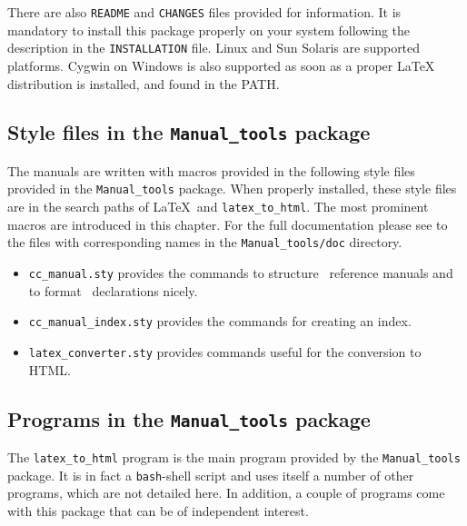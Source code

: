 There are also \texttt{README} and \texttt{CHANGES} files provided for
information. It is mandatory to install this package properly on your
system following the description in the \texttt{INSTALLATION} file. Linux
and Sun Solaris are supported platforms. Cygwin on Windows is also
supported as soon as a proper LaTeX distribution is installed, and
found in the PATH.

\subsection{Style files in the \texttt{Manual\_tools} package}
\label{subsec:manual_tools_style_files}

The manuals are written with macros provided in the following style
files provided in the \texttt{Manual\_tools} package. When properly
installed, these style files are in the search paths of \LaTeX\ and
\texttt{latex\_to\_html}. The most prominent macros are introduced in
this chapter. For the full documentation please see to the files with
corresponding names in the \texttt{Manual\_tools/doc}
directory.

\begin{itemize}
   \item {\tt cc\_manual.sty}
       provides the commands to structure \CC\ reference manuals
       and to format \CC\ declarations nicely.
   \item {\tt cc\_manual\_index.sty} provides the commands for creating an
       index.
   \item {\tt latex\_converter.sty}
       provides commands useful for the conversion to HTML.
\end{itemize}


\subsection{Programs in the \texttt{Manual\_tools} package}
\label{subsec:manual_tools_programs}

The \texttt{latex\_to\_html} program is the main program provided by
the \texttt{Manual\_tools} package. It is in fact a
\texttt{bash}-shell script and uses itself a number of other programs,
which are not detailed here. In addition, a couple of programs
come with this package that can be of independent interest.

